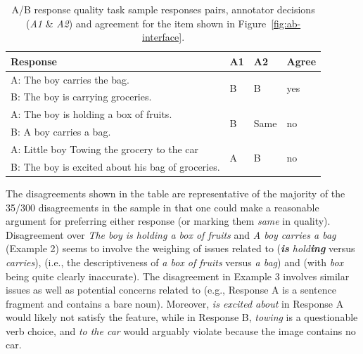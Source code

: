 \begin{table}[htb!]
\begin{center}
\begin{tabular}{|l|l|l|l|}
\hline
 Response & A1 & A2 & Agree \\
\hline
\hline
A: The boy carries the bag. & \multirow{2}{*}{B} & \multirow{2}{*}{B} & \multirow{2}{*}{yes} \\
\cline{1-1}
B: The boy is carrying groceries. & & & \\
\hline
\hline
A: The boy is holding a box of fruits. & \multirow{2}{*}{B} & \multirow{2}{*}{Same} & \multirow{2}{*}{no} \\
\cline{1-1}
B: A boy carries a bag. & & & \\
\hline
\hline
A: Little boy Towing the grocery to the car & \multirow{2}{*}{A} & \multirow{2}{*}{B} & \multirow{2}{*}{no} \\
\cline{1-1}
B: The boy is excited about his bag of groceries. & & & \\
\hline
\end{tabular}
\caption{\label{tab:ab-example-pairs} A/B response quality task sample responses pairs, annotator decisions (\textit{A1} \& \textit{A2}) and agreement for the item shown in Figure~\ref{fig:ab-interface}.}
\end{center}
\end{table}

The disagreements shown in the table are representative of the majority of the 35/300 disagreements in the sample in that one could make a reasonable argument for preferring either response (or marking them \textit{same} in quality). Disagreement over \textit{The boy is holding a box of fruits} and \textit{A boy carries a bag} (Example 2) seems to involve the weighing of issues related to  (\textit{\textbf{is} hold\textbf{ing}} versus \textit{carries}),  (i.e., the descriptiveness of \textit{a box of fruits} versus \textit{a bag}) and  (with \textit{box} being quite clearly inaccurate). The disagreement in Example 3 involves similar  issues as well as potential concerns related to  (e.g., Response A is a sentence fragment and contains a bare noun). Moreover, \textit{is excited about} in Response A would likely not satisfy the  feature, while in Response B, \textit{towing} is a questionable verb choice, and \textit{to the car} would arguably violate  because the image contains no car.

